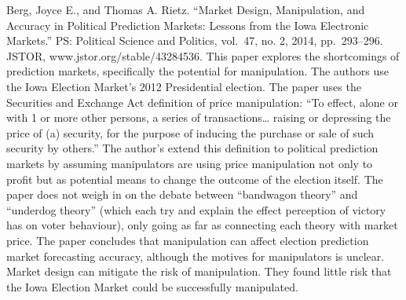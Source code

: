 \documentclass[]{article}
\begin{document}
Berg, Joyce E., and Thomas A. Rietz. ``Market Design, Manipulation, and
Accuracy in Political Prediction Markets: Lessons from the Iowa
Electronic Markets.'' PS: Political Science and Politics, vol.~47, no.
2, 2014, pp.~293--296. JSTOR, www.jstor.org/stable/43284536. This paper
explores the shortcomings of prediction markets, specifically the
potential for manipulation. The authors use the Iowa Election Market's
2012 Presidential election. The paper uses the Securities and Exchange
Act definition of price manipulation: ``To effect, alone or with 1 or
more other persons, a series of transactions\ldots{} raising or
depressing the price of (a) security, for the purpose of inducing the
purchase or sale of such security by others.'' The author's extend this
definition to political prediction markets by assuming manipulators are
using price manipulation not only to profit but as potential means to
change the outcome of the election itself. The paper does not weigh in
on the debate between ``bandwagon theory'' and ``underdog theory''
(which each try and explain the effect perception of victory has on
voter behaviour), only going as far as connecting each theory with
market price. The paper concludes that manipulation can affect election
prediction market forecasting accuracy, although the motives for
manipulators is unclear. Market design can mitigate the risk of
manipulation. They found little risk that the Iowa Election Market could
be successfully manipulated.
\end{document}
